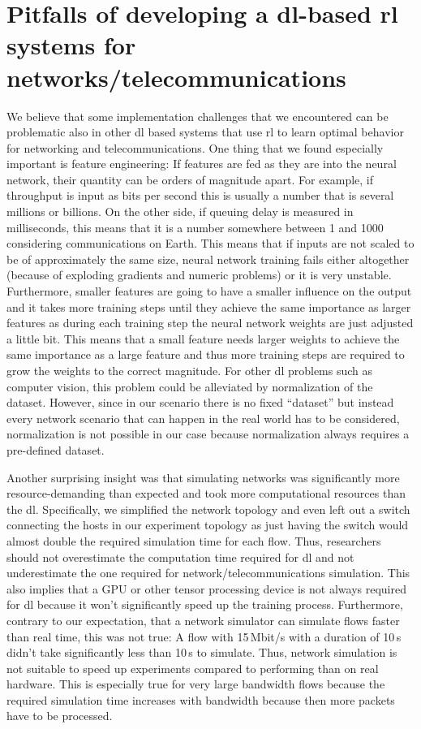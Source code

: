 \documentclass[conference]{IEEEtran}
\begin{document}
\section{Pitfalls of developing a \gls{dl}-based \gls{rl} systems for networks/telecommunications}

We believe that some implementation challenges that we encountered can be problematic also in other \gls{dl} based systems that use \gls{rl} to learn optimal behavior for networking and telecommunications. One thing that we found especially important is feature engineering: If features are fed as they are into the neural network, their quantity can be orders of magnitude apart. For example, if throughput is input as bits per second this is usually a number that is several millions or billions. On the other side, if queuing delay is measured in milliseconds, this means that it is a number somewhere between 1 and 1000 considering communications on Earth. This means that if inputs are not scaled to be of approximately the same size, neural network training fails either altogether (because of exploding gradients and numeric problems) or it is very unstable. Furthermore, smaller features are going to have a smaller influence on the output and it takes more training steps until they achieve the same importance as larger features as during each training step the neural network weights are just adjusted a little bit. This means that a small feature needs larger weights to achieve the same importance as a large feature and thus more training steps are required to grow the weights to the correct magnitude. For other \gls{dl} problems such as computer vision, this problem could be alleviated by normalization of the dataset. However, since in our scenario there is no fixed ``dataset'' but instead every network scenario that can happen in the real world has to be considered, normalization is not possible in our case because normalization always requires a pre-defined dataset. 

Another surprising insight was that simulating networks was significantly more resource-demanding than expected and took more computational resources than the \gls{dl}. Specifically, we simplified the network topology and even left out a switch connecting the hosts in our experiment topology as just having the switch would almost double the required simulation time for each flow. Thus, researchers should not overestimate the computation time required for \gls{dl} and not underestimate the one required for network/telecommunications simulation. This also implies that a GPU or other tensor processing device is not always required for \gls{dl} because it won't significantly speed up the training process. Furthermore, contrary to our expectation, that a network simulator can simulate flows faster than real time, this was not true: A flow with 15\,Mbit/s with a duration of 10\,s didn't take significantly less than 10\,s to simulate. Thus, network simulation is not suitable to speed up experiments compared to performing than on real hardware. This is especially true for very large bandwidth flows because the required simulation time increases with bandwidth because then more packets have to be processed. 
\end{document}
